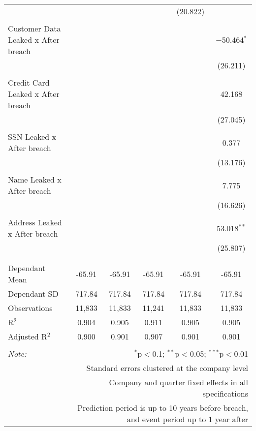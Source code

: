 \begin{table}[!htbp]
\begin{tabular}{@{\extracolsep{5pt}}lccccc}
  &  &  &  & (20.822) &  \\ 
  & & & & & \\ 
 Customer Data Leaked x After breach &  &  &  &  & $-$50.464$^{*}$ \\ 
  &  &  &  &  & (26.211) \\ 
  & & & & & \\ 
 Credit Card Leaked x After breach &  &  &  &  & 42.168 \\ 
  &  &  &  &  & (27.045) \\ 
  & & & & & \\ 
 SSN Leaked x After breach &  &  &  &  & 0.377 \\ 
  &  &  &  &  & (13.176) \\ 
  & & & & & \\ 
 Name Leaked x After breach &  &  &  &  & 7.775 \\ 
  &  &  &  &  & (16.626) \\ 
  & & & & & \\ 
 Address Leaked x After breach &  &  &  &  & 53.018$^{**}$ \\ 
  &  &  &  &  & (25.807) \\ 
  & & & & & \\ 
\hline \\[-1.8ex] 
Dependant Mean & -65.91 & -65.91 & -65.91 & -65.91 & -65.91 \\ 
Dependant SD & 717.84 & 717.84 & 717.84 & 717.84 & 717.84 \\ 
Observations & 11,833 & 11,833 & 11,241 & 11,833 & 11,833 \\ 
R$^{2}$ & 0.904 & 0.905 & 0.911 & 0.905 & 0.905 \\ 
Adjusted R$^{2}$ & 0.900 & 0.901 & 0.907 & 0.901 & 0.901 \\ 
\hline 
\hline \\[-1.8ex] 
\textit{Note:}  & \multicolumn{5}{r}{$^{*}$p$<$0.1; $^{**}$p$<$0.05; $^{***}$p$<$0.01} \\ 
 & \multicolumn{5}{r}{Standard errors clustered at the company level} \\ 
 & \multicolumn{5}{r}{Company and quarter fixed effects in all specifications} \\ 
 & \multicolumn{5}{r}{Prediction period is up to 10 years before breach, and event period up to 1 year after} \\ 
\end{tabular} 
\end{table} 
